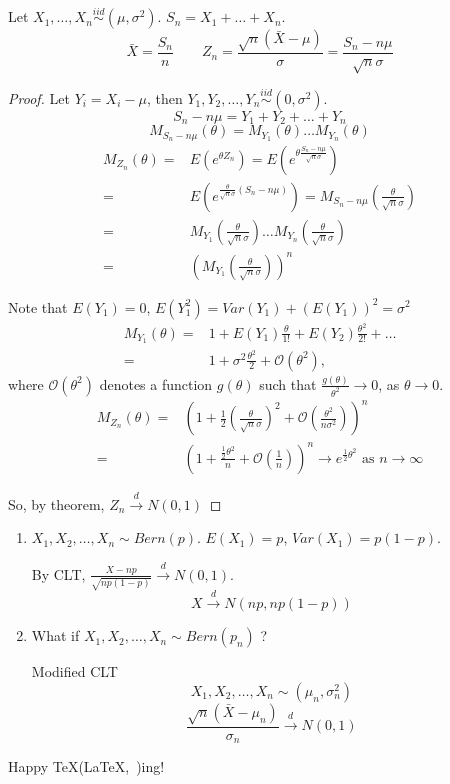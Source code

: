 \begin{theo}
Let $X_1,\dots,X_n \overset{iid}{\sim} (\mu,\sigma^2)$. $S_n=X_1+\dots+X_n$.
\[\bar{X}=\frac{S_n}{n} \qquad Z_n=\frac{\sqrt{n}(\bar{X}-\mu)}{\sigma}=\frac{S_n-n\mu}{\sqrt{n}\sigma}\]

\begin{proof}
Let $Y_i=X_i-\mu$, then $Y_1,Y_2,\dots,Y_n\overset{iid}{\sim} (0,\sigma^2)$.
\[S_n-n\mu=Y_1+Y_2+\dots+Y_n\]
\[M_{S_n-n\mu}(\theta)=M_{Y_1}(\theta)\dots M_{Y_n}(\theta)\]
\begin{align*}
M_{Z_n}(\theta)= & E(e^{\theta Z_n})=E\left(e^{\theta \frac{S_n-n\mu}{\sqrt{n}\sigma}} \right) \\
= & E\left(e^{\frac{\theta}{\sqrt{n}\sigma}(S_n-n\mu)} \right) 
=  M_{S_n-n\mu} \left(\frac{\theta}{\sqrt{n}\sigma}\right) \\
= & M_{Y_1}\left(\frac{\theta}{\sqrt{n}\sigma}\right) \dots M_{Y_n}\left(\frac{\theta}{\sqrt{n}\sigma}\right)\\
= & \left(M_{Y_1}\left(\frac{\theta}{\sqrt{n}\sigma}\right)\right)^n
\end{align*}

Note that $E(Y_1)=0$, $E(Y_1^2)=Var(Y_1)+(E(Y_1))^2=\sigma^2$
\begin{align*}
M_{Y_1}(\theta) =& 1+ E(Y_1) \frac{\theta}{1!} + E(Y_2) \frac{\theta^2}{2!} +\dots \\
=& 1+ \sigma^2 \frac{\theta^2}{2} + \mathcal{O}(\theta^2),
\end{align*}
where $\mathcal{O}(\theta^2)$ denotes a function $g(\theta)$ such that $\frac{g(\theta)}{\theta^2}\to 0$, as $\theta \to 0$.
\begin{align*}
M_{Z_n}(\theta) =& \left(		1+\frac{1}{2}\left(\frac{\theta}{\sqrt{n}\sigma}\right)^2+\mathcal{O}\left(\frac{\theta^2}{n\sigma^2}\right)		\right)^n \\
= & \left(		1+\frac{\frac{1}{2}\theta^2}{n}+\mathcal{O}\left(\frac{1}{n}\right)		\right)^n \longrightarrow e^{\frac{1}{2}\theta^2} \text{ as } n\to\infty
\end{align*}

So, by theorem, $Z_n\overset{d}{\longrightarrow}N(0,1)$
\end{proof}
\end{theo}

\begin{enumerate}
\item $X_1,X_2,\dots,X_n \sim Bern(p)$. $E(X_1)=p$, $Var(X_1)=p(1-p)$.

By CLT, $\frac{X-np}{\sqrt{np(1-p)}}\overset{d}{\longrightarrow}N(0,1)$.
\[X \overset{d}{\longrightarrow}N(np,np(1-p))\]

\item What if $X_1,X_2,\dots,X_n \sim Bern(p_n)$ ?

Modified CLT
\[X_1,X_2,\dots,X_n \sim (\mu_n,\sigma_n^2)\]
\[\frac{\sqrt{n}(\bar{X}-\mu_n)}{\sigma_n} \overset{d}{\longrightarrow} N(0,1)\]
\end{enumerate}

\newpage
Happy \TeX(\LaTeX,~\LaTeXe)ing! %